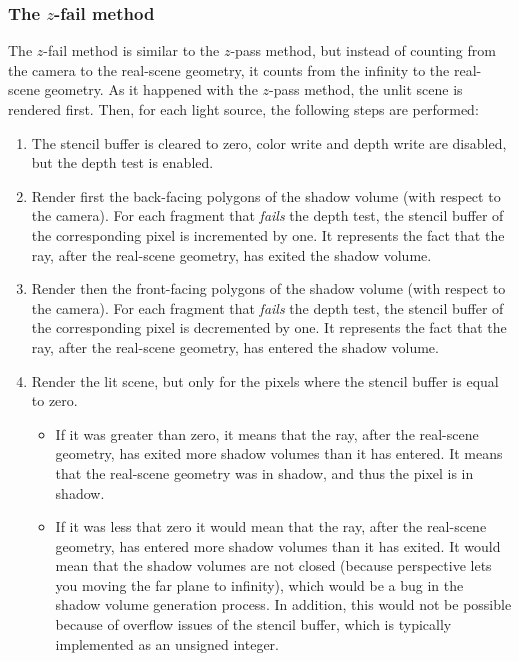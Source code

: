 \subsubsection{The $z$-fail method}

The $z$-fail method is similar to the $z$-pass method, but instead of counting from the camera to the real-scene geometry, it counts from the infinity to the real-scene geometry. As it happened with the $z$-pass method, the unlit scene is rendered first. Then, for each light source, the following steps are performed:
\begin{enumerate}
    \item The stencil buffer is cleared to zero, color write and depth write are disabled, but the depth test is enabled.
    \item Render first the back-facing polygons of the shadow volume (with respect to the camera). For each fragment that \emph{fails} the depth test, the stencil buffer of the corresponding pixel is incremented by one. It represents the fact that the ray, after the real-scene geometry, has exited the shadow volume.
    \item Render then the front-facing polygons of the shadow volume (with respect to the camera). For each fragment that \emph{fails} the depth test, the stencil buffer of the corresponding pixel is decremented by one. It represents the fact that the ray, after the real-scene geometry, has entered the shadow volume.
    \item Render the lit scene, but only for the pixels where the stencil buffer is equal to zero.
    \begin{itemize}
        \item  If it was greater than zero, it means that the ray, after the real-scene geometry, has exited more shadow volumes than it has entered. It means that the real-scene geometry was in shadow, and thus the pixel is in shadow.
        \item If it was less that zero it would mean that the ray, after the real-scene geometry, has entered more shadow volumes than it has exited. It would mean that the shadow volumes are not closed (because perspective lets you moving the far plane to infinity), which would be a bug in the shadow volume generation process. In addition, this would not be possible because of overflow issues of the stencil buffer, which is typically implemented as an unsigned integer.
    \end{itemize}
\end{enumerate}

